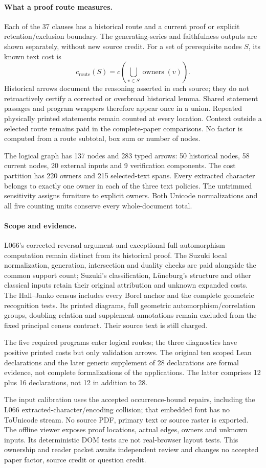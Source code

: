 \documentclass[a4paper,11pt]{article}
\begin{document}
\paragraph{What a proof route measures.}
Each of the 37 clauses has a historical route and a current proof or explicit
retention/exclusion boundary. The generating-series and faithfulness outputs are
shown separately, without new source credit. For a set of prerequisite nodes
$S$, its known text cost is
\[c_{\mathrm{route}}(S)=c\!\left(\bigcup_{v\in S}\operatorname{owners}(v)\right).\]
Historical arrows document the reasoning asserted in each source; they do not
retroactively certify a corrected or overbroad historical lemma.
Shared statement passages and program wrappers therefore appear once in a union.
Repeated physically printed statements remain counted at every location.
Context outside a selected route remains paid in the complete-paper comparisons.
No factor is computed from a route subtotal, box sum or number of nodes.

The logical graph has 137 nodes and 283 typed arrows: 50 historical nodes,
58 current nodes, 20 external inputs and 9 verification components. The cost
partition has 220 owners and 215 selected-text spans. Every extracted character
belongs to exactly one owner in each of the three text policies. The untrimmed
sensitivity assigns furniture to explicit owners. Both Unicode normalizations
and all five counting units conserve every whole-document total.

\paragraph{Scope and evidence.}
L066's corrected reversal argument and exceptional full-automorphism computation
remain distinct from its historical proof. The Suzuki local normalization,
generation, intersection and duality checks are paid alongside the common
support count; Suzuki's classification, Lüneburg's structure and other classical
inputs retain their original attribution and unknown expanded costs.
The Hall--Janko census includes every Borel anchor and the complete geometric
recognition tests. Its printed diagrams, full geometric automorphism/correlation
groups, doubling relation and supplement annotations remain excluded from the
fixed principal census contract. Their source text is still charged.

The five required programs enter logical routes; the three diagnostics have
positive printed costs but only validation arrows. The original ten scoped Lean
declarations and the later generic supplement of 28 declarations are formal
evidence, not complete formalizations of the applications. The latter comprises
12 plus 16 declarations, not 12 in addition to 28.

The input calibration uses the accepted occurrence-bound repairs, including the
L066 extracted-character/encoding collision; that embedded font has no
ToUnicode stream. No source PDF, primary text or source raster is exported.
The offline viewer exposes proof locations, actual edges, owners and unknown
inputs. Its deterministic DOM tests are not real-browser layout tests. This
ownership and reader packet awaits independent review and changes no accepted
paper factor, source credit or question credit.
\end{document}

